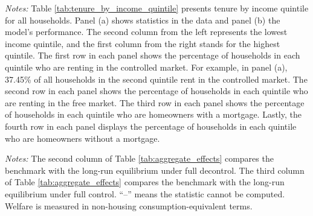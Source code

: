 \documentclass[parskip=full]{article}
\newenvironment{fignote2}[1]
{
\par
\medskip
\begin{minipage}{#1}
\footnotesize
}
{
\end{minipage}
}
\begin{document}
\begin{table}[H]
    \centering
    \caption{Tenure by income quintile for all households in benchmark}
    \vspace{-0.5cm}
    \label{tab:tenure_by_income_quintile}    
    
    \vspace{-0.45cm}
    \begin{fignote2}{0.66\textwidth}
      \textit{Notes:} Table \ref{tab:tenure_by_income_quintile} presents tenure by income quintile for all households. Panel (a) shows statistics in the data and panel (b) the model's performance. The second column from the left represents the lowest income quintile, and the first column from the right stands for the highest quintile. The first row in each panel shows the percentage of households in each quintile who are renting in the controlled market. For example, in panel (a), 37.45\% of all households in the second quintile rent in the controlled market. The second row in each panel shows the percentage of households in each quintile who are renting in the free market. The third row in each panel shows the percentage of households in each quintile who are homeowners with a mortgage. Lastly, the fourth row in each panel displays the percentage of households in each quintile who are homeowners without a mortgage.
    \end{fignote2}
\end{table}

\begin{table}[H]
    \centering
    \caption{Aggregate effects}
    \vspace{-0.5cm}
    \label{tab:aggregate_effects}
    
    \vspace{-0.45cm}
    \begin{fignote2}{0.67\textwidth}
      \textit{Notes:} The second column of Table \ref{tab:aggregate_effects} compares the benchmark with the long-run equilibrium under full decontrol. The third column of Table \ref{tab:aggregate_effects} compares the benchmark with the long-run equilibrium under full control. “--” means the statistic cannot be computed. Welfare is measured in non-housing consumption-equivalent terms.
    \end{fignote2}
\end{table}
\end{document}
